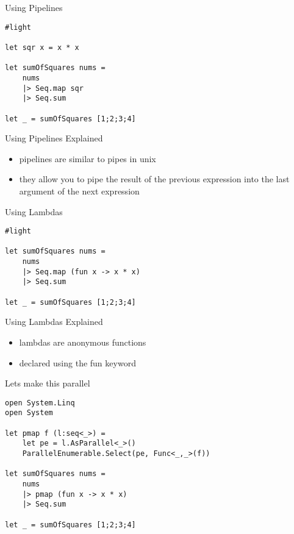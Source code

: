 \documentclass[landscape]{slides}
\begin{document}
\begin{slide}{Using Pipelines}
\begin{verbatim}
#light

let sqr x = x * x

let sumOfSquares nums =
    nums 
    |> Seq.map sqr
    |> Seq.sum

let _ = sumOfSquares [1;2;3;4]
\end{verbatim}
\end{slide}

\begin{slide}{Using Pipelines Explained}
\begin{itemize}
\item pipelines are similar to pipes in unix
\item they allow you to pipe the result of the previous expression into the last argument of the next expression
\end{itemize}
\end{slide}

\begin{slide}{Using Lambdas}
\begin{verbatim}
#light

let sumOfSquares nums =
    nums 
    |> Seq.map (fun x -> x * x) 
    |> Seq.sum

let _ = sumOfSquares [1;2;3;4]
\end{verbatim}
\end{slide}

\begin{slide}{Using Lambdas Explained}
\begin{itemize}
\item lambdas are anonymous functions
\item declared using the fun keyword
\end{itemize}
\end{slide}

\begin{slide}{Lets make this parallel}
\begin{verbatim}
open System.Linq
open System

let pmap f (l:seq<_>) =
    let pe = l.AsParallel<_>()
    ParallelEnumerable.Select(pe, Func<_,_>(f))

let sumOfSquares nums =
    nums
    |> pmap (fun x -> x * x) 
    |> Seq.sum

let _ = sumOfSquares [1;2;3;4]
\end{verbatim}
\end{slide}
\end{document}
